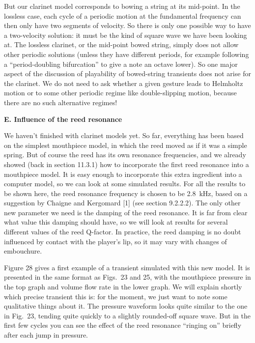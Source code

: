   But our clarinet model corresponds to bowing a string at its mid-point. In 
  the lossless case, each cycle of a periodic motion at the fundamental 
  frequency can then only have two segments of velocity. So there is only one 
  possible way to have a two-velocity solution: it must be the kind of square 
  wave we have been looking at. The lossless clarinet, or the mid-point bowed 
  string, simply does not allow other periodic solutions (unless they have 
  different periods, for example following a “period-doubling bifurcation” to 
  give a note an octave lower). So one major aspect of the discussion of 
  playability of bowed-string transients does not arise for the clarinet. We do 
  not need to ask whether a given gesture leads to Helmholtz motion or to some 
  other periodic regime like double-slipping motion, because there are no such 
  alternative regimes! 

  \textbf{E. Influence of the reed resonance} 

  We haven’t finished with clarinet models yet. So far, everything has been 
  based on the simplest mouthpiece model, in which the reed moved as if it was 
  a simple spring. But of course the reed has its own resonance frequencies, 
  and we already showed (back in section 11.3.1) how to incorporate the first 
  reed resonance into a mouthpiece model. It is easy enough to incorporate this 
  extra ingredient into a computer model, so we can look at some simulated 
  results. For all the results to be shown here, the reed resonance frequency 
  is chosen to be 2.8~kHz, based on a suggestion by Chaigne and Kergomard [1] 
  (see section 9.2.2.2). The only other new parameter we need is the damping of 
  the reed resonance. It is far from clear what value this damping should have, 
  so we will look at results for several different values of the reed Q-factor. 
  In practice, the reed damping is no doubt influenced by contact with the 
  player's lip, so it may vary with changes of embouchure. 

  Figure 28 gives a first example of a transient simulated with this new model. 
  It is presented in the same format as Figs.\ 23 and 25, with the mouthpiece 
  pressure in the top graph and volume flow rate in the lower graph. We will 
  explain shortly which precise transient this is: for the moment, we just want 
  to note some qualitative things about it. The pressure waveform looks quite 
  similar to the one in Fig.\ 23, tending quite quickly to a slightly 
  rounded-off square wave. But in the first few cycles you can see the effect 
  of the reed resonance “ringing on” briefly after each jump in pressure. 

